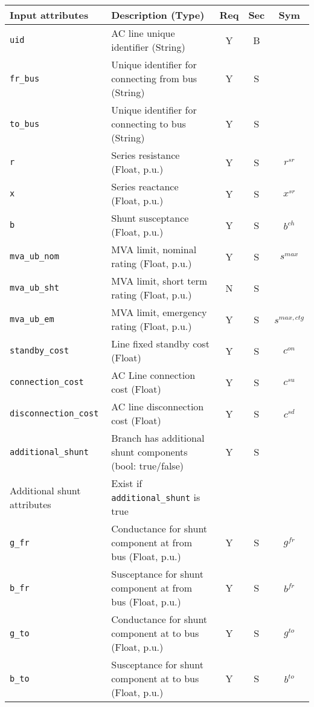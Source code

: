 \documentclass{article}
\begin{document}
\begin{center}
\small
\begin{tabular}{ l | l | c | c | c | }
Input attributes & Description (Type)& Req & Sec & Sym\\
\hline
  {\tt uid} & AC line unique identifier (String)& Y & B &  \\
  {\tt fr\_bus} & Unique identifier for connecting from bus (String)& Y & S & \\
  {\tt to\_bus} & Unique identifier for connecting to bus (String)& Y & S & \\
  {\tt r} & Series resistance (Float, p.u.)& Y & S & $r^{sr}$\\
  {\tt x} & Series reactance  (Float, p.u.)& Y & S & $x^{sr}$\\
  {\tt b} & Shunt susceptance (Float, p.u.)& Y & S & $b^{ch}$\\    
  {\tt mva\_ub\_nom} & MVA limit, nominal rating (Float, p.u.)& Y & S & $s^{max}$\\
  {\tt mva\_ub\_sht} & MVA limit, short term rating (Float, p.u.)& N & S & \\
  {\tt mva\_ub\_em} & MVA limit, emergency rating (Float, p.u.)& Y & S & $s^{max,ctg}$\\  
  {\tt standby\_cost} & Line fixed standby cost (Float) & Y & S & $c^{on}$\\
  {\tt connection\_cost} &  AC Line connection cost (Float) & Y & S & $c^{su}$\\ 
  {\tt disconnection\_cost} & AC line disconnection cost (Float) & Y & S & $c^{sd}$\\
  {\tt additional\_shunt} & Branch has additional shunt components (bool: true/false)& Y & S & \\
  \hline
  Additional shunt attributes & Exist if {\tt additional\_shunt} is true &  & & \\
  \hline
  {\tt g\_fr} & Conductance for shunt component at from bus (Float, p.u.)& Y & S & $g^{fr}$\\
  {\tt b\_fr} & Susceptance for shunt component at from bus (Float, p.u.)& Y & S & $b^{fr}$\\
  {\tt g\_to} & Conductance for shunt component at to bus (Float, p.u.)& Y & S & $g^{to}$\\
  {\tt b\_to} & Susceptance for shunt component at to bus (Float, p.u.)& Y & S & $b^{to}$\\
  \hline
\end{tabular}
\end{center}
\end{document}
